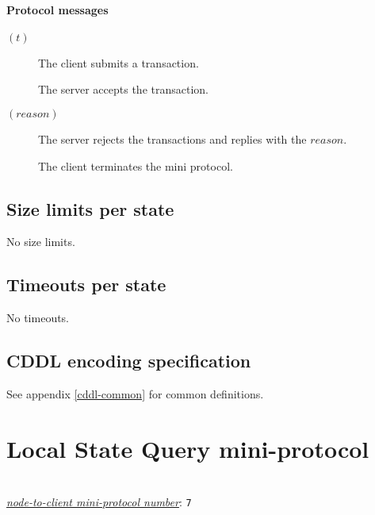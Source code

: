 \paragraph{Protocol messages}
\begin{description}
\item [\MsgSubmitTx{} {\boldmath $(t)$}]
      The client submits a transaction.
\item [\MsgAcceptTx]
      The server accepts the transaction.
\item [\MsgRejectTx{} {\boldmath $(reason)$}]
      The server rejects the transactions and replies with the $reason$.
\item [\MsgDone]
      The client terminates the mini protocol.
\end{description}

\subsection{Size limits per state}

No size limits.

\subsection{Timeouts per state}

No timeouts.

\subsection{CDDL encoding specification}

See appendix \ref{cddl-common} for common definitions.

\section{Local State Query mini-protocol}
\label{local-state-query-protocol}
\\
\hyperref[table:node-to-client-protocol-numbers]{\textit{node-to-client mini-protocol number}}: \texttt{7}\\
\newcommand{\StAcquiring}{\state{Acquiring}}
\newcommand{\StAcquired}{\state{Acquired}}
\newcommand{\StQuerying}{\state{Querying}}
\newcommand{\MsgAcquire}{\trans{MsgAcquire}}
\newcommand{\MsgAcquired}{\trans{MsgAcquired}}
\newcommand{\MsgFailure}{\trans{MsgFailure}}
\newcommand{\MsgQuery}{\trans{MsgQuery}}
\newcommand{\MsgResult}{\trans{MsgResult}}
\newcommand{\MsgRelease}{\trans{MsgRelease}}
\newcommand{\MsgReAcquire}{\trans{MsgReAcquire}}

